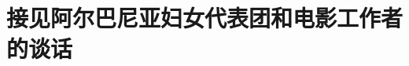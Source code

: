 \section[接见阿尔巴尼亚妇女代表团和电影工作者的谈话（一九六四年五月十五日）]{接见阿尔巴尼亚妇女代表团和电影工作者的谈话}


\begin{list}{}{
    \setlength{\topsep}{0pt}        %
    \setlength{\partopsep}{0pt}     %
    \setlength{\parsep}{\parskip}   %
    \setlength{\itemsep}{\lineskip}       %
    \setlength{\labelsep}{0pt}%
    \setlength{\labelwidth}{3em}%
    \setlength{\itemindent}{0pt}%
    \setlength\listparindent{\parindent}
    \setlength{\leftmargin}{3em}
    \setlength{\rightmargin}{0pt}
    }


\end{list}
